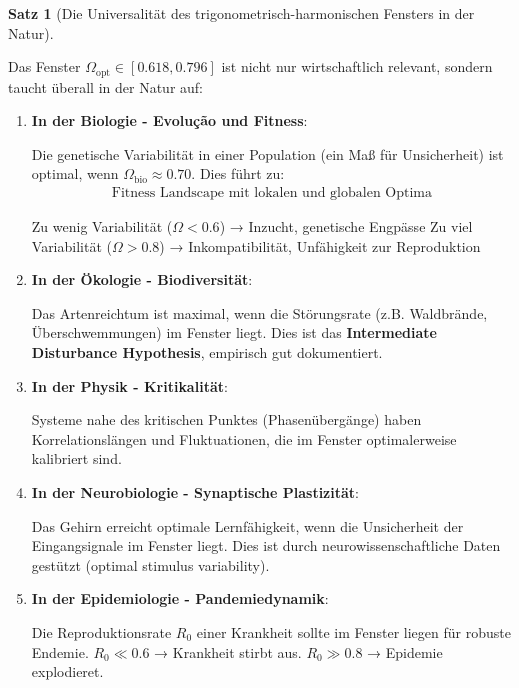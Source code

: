 \documentclass[a4paper, 12pt, twoside, openright]{report}
\theoremstyle{definition}
\theoremstyle{definition}
\newtheorem{satz}{Satz}[chapter]
\begin{document}
\begin{satz}[Die Universalität des trigonometrisch-harmonischen Fensters in der Natur]
\label{satz:universal_resonance}

Das Fenster $\Omega_{\text{opt}} \in [0.618, 0.796]$ ist nicht nur wirtschaftlich relevant, sondern taucht überall in der Natur auf:

\begin{enumerate}
	\item \textbf{In der Biologie - Evolução und Fitness}:
	
	Die genetische Variabilität in einer Population (ein Maß für Unsicherheit) ist optimal, wenn $\Omega_{\text{bio}} \approx 0.70$. Dies führt zu:
	\begin{align}
	\text{Fitness Landscape mit lokalen und globalen Optima}
	\end{align}
	
	Zu wenig Variabilität ($\Omega < 0.6$) → Inzucht, genetische Engpässe
	Zu viel Variabilität ($\Omega > 0.8$) → Inkompatibilität, Unfähigkeit zur Reproduktion
	
	\item \textbf{In der Ökologie - Biodiversität}:
	
	Das Artenreichtum ist maximal, wenn die Störungsrate (z.B. Waldbrände, Überschwemmungen) im Fenster liegt. Dies ist das \textbf{Intermediate Disturbance Hypothesis}, empirisch gut dokumentiert.
	
	\item \textbf{In der Physik - Kritikalität}:
	
	Systeme nahe des kritischen Punktes (Phasenübergänge) haben Korrelationslängen und Fluktuationen, die im Fenster optimalerweise kalibriert sind.
	
	\item \textbf{In der Neurobiologie - Synaptische Plastizität}:
	
	Das Gehirn erreicht optimale Lernfähigkeit, wenn die Unsicherheit der Eingangsignale im Fenster liegt. Dies ist durch neurowissenschaftliche Daten gestützt (optimal stimulus variability).
	
	\item \textbf{In der Epidemiologie - Pandemiedynamik}:
	
	Die Reproduktionsrate $R_0$ einer Krankheit sollte im Fenster liegen für robuste Endemie. $R_0 \ll 0.6$ → Krankheit stirbt aus. $R_0 \gg 0.8$ → Epidemie explodieret.
\end{enumerate}

\end{satz}
\end{document}
